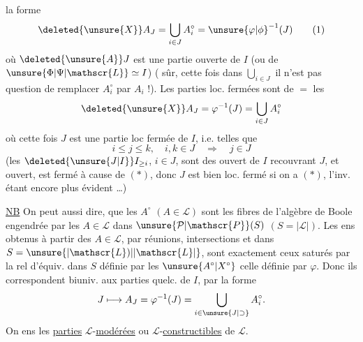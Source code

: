 la forme
\[
 \deleted{\unsure{X}}A_J=\bigcup_{i\in J}A_i^\circ={\unsure{\varphi|\phi}}^{-1}(J)
 \tag*{(1)}
\]
où $\deleted{\unsure{A}}J$ est une partie ouverte de $I$ (ou de $\unsure{\Phi|\Psi|\mathscr{L}}\simeq I$) ( sûr, cette fois dans $\displaystyle\bigcup_{i\in J}$ il n'est pas question de remplacer $A_i^\circ$ par $A_i$ !). Les parties loc. fermées sont de \ensuremath{=} les
\[
 \deleted{\unsure{X}}A_J=\varphi^{-1}(J)=\bigcup_{i\in J}A_i^\circ
\]
où cette fois $J$ est une partie loc fermée de $I$, i.e. telles que
\[
 i\leq j\leq k,\quad i,k\in J\quad\Rightarrow\quad j\in J
 \tag*{$(*)$}
\]
(les $\deleted{\unsure{J|I}}I_{\geq i}$, $i\in J$, sont des ouvert de $I$ recouvrant $J$, et  ouvert,  est fermé  à cause de $(*)$, donc $J$ est bien loc. fermé si on a $(*)$, l'inv. étant encore plus évident \ldots)

\uline{NB} On peut aussi dire,  que les $A^\circ$ $(A\in\mathscr{L})$ sont les  fibres de l'algèbre de Boole engendrée par les $A\in\mathscr{L}$ dans $\unsure{\mathcal{P}|\mathscr{P}}(S)$ $(S=|\mathscr{L}|)$. Les ens obtenus à partir des $A\in\mathscr{L}$, par réunions, intersections et  dans $S=\unsure{\lvert\mathscr{L})|\lvert\mathscr{L}\rvert}$, sont exactement ceux saturés par la rel d'équiv. dans $S$ définie par les $\unsure{A^\circ|X^\circ}$  celle définie par $\varphi$. Donc ils correspondent biuniv. aux parties quelc. de $I$, par la forme
\[
 J\longmapsto A_J=\varphi^{-1}(J)=\bigcup_{i\in\unsure{J|\supset}}A_i^\circ .
\]
On   ens  les \uline{parties} $\mathscr{L}$-\uline{modérées} ou $\mathscr{L}$-\uline{constructibles} de $\mathscr{L}$.
